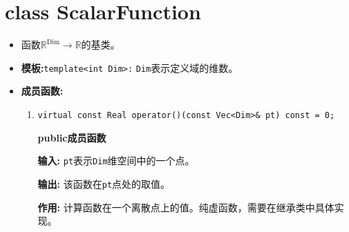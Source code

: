 \documentclass[UTF8]{ctexart}
\theoremstyle{plain}
\theoremstyle{definition}
\theoremstyle{remark}
\begin{document}
\section{class ScalarFunction}
\begin{itemize}
    \item 函数$\mathbb{R}^{\text{Dim}}\rightarrow\mathbb{R}$的基类。
    \item \textbf{模板:}\texttt{template<int Dim>:}
    \texttt{Dim}表示定义域的维数。
    \item \textbf{成员函数:}
    \begin{enumerate}
        \item \texttt{virtual const Real operator()(const Vec<Dim>\& pt) const = 0;}
    
          \textbf{public成员函数}
    
          \textbf{输入:} \texttt{pt}表示\texttt{Dim}维空间中的一个点。
    
          \textbf{输出:} 该函数在\texttt{pt}点处的取值。
    
          \textbf{作用:} 计算函数在一个离散点上的值。纯虚函数，需要在继承类中具体实现。
    \end{enumerate}
\end{itemize}
\end{document}
